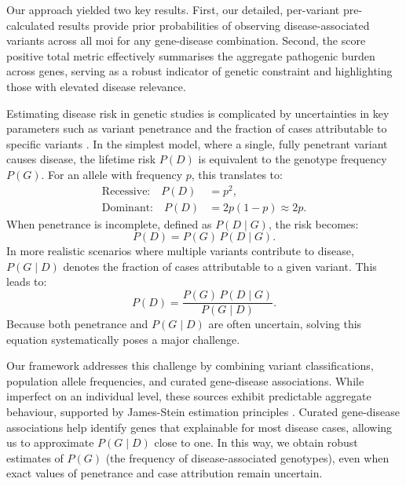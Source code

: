 Our approach yielded two key results. First, our detailed, per-variant pre-calculated results provide prior probabilities of observing disease-associated variants across all \ac{moi} for any gene-disease combination. Second, the score positive total metric effectively summarises the aggregate pathogenic burden across genes, serving as a robust indicator of genetic constraint and highlighting those with elevated disease relevance.

Estimating disease risk in genetic studies is complicated by uncertainties in key parameters such as variant penetrance and the fraction of cases attributable to specific variants \cite{zschocke_mendelian_2023}. 
In the simplest model, where a single, fully penetrant variant causes disease, the lifetime risk \(P(D)\) is equivalent to the genotype frequency \(P(G)\). 
For an allele with frequency \(p\), this translates to:
\[
\begin{aligned}
\text{Recessive:} \quad P(D) &= p^2, \\
\text{Dominant:} \quad P(D) &= 2p(1-p) \approx 2p.
\end{aligned}
\]
When penetrance is incomplete, defined as \(P(D\mid G)\), the risk becomes:
\[
P(D) = P(G)\,P(D\mid G).
\]
In more realistic scenarios where multiple variants contribute to disease, \(P(G\mid D)\) denotes the fraction of cases attributable to a given variant. This leads to:
\[
P(D) = \frac{P(G)\,P(D\mid G)}{P(G\mid D)}.
\]
Because both penetrance and \(P(G\mid D)\) are often uncertain, solving this equation systematically poses a major challenge.

Our framework addresses this challenge by combining variant classifications, population allele frequencies, and curated gene-disease associations. 
While imperfect on an individual level, these sources exhibit predictable aggregate behaviour, supported by James-Stein estimation principles \cite{efron_steins_1973}.
Curated gene-disease associations help identify genes that explainable for most disease cases, allowing us to approximate \(P(G\mid D)\) close to one. In this way, we obtain robust estimates of \(P(G)\) (the frequency of disease-associated genotypes), even when exact values of penetrance and case attribution remain uncertain.

